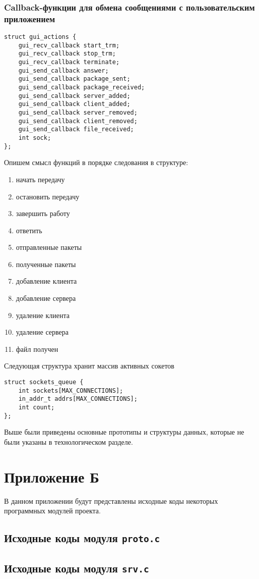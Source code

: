 \begin{appendix}
\subsubsection*{Callback-функции для обмена сообщениями с пользовательским приложением}
\begin{lstlisting}
struct gui_actions {
    gui_recv_callback start_trm;
    gui_recv_callback stop_trm;
    gui_recv_callback terminate;
    gui_send_callback answer;
    gui_send_callback package_sent;
    gui_send_callback package_received;
    gui_send_callback server_added;
    gui_send_callback client_added;
    gui_send_callback server_removed;
    gui_send_callback client_removed;
    gui_send_callback file_received;
    int sock;
};
\end{lstlisting}

Опишем смысл функций в порядке следования в структуре:

\begin{enumerate}
    \item начать передачу
    \item остановить передачу
    \item завершить работу
    \item ответить
    \item отправленные пакеты
    \item полученные пакеты
    \item добавление клиента
    \item добавление сервера
    \item удаление клиента
    \item удаление сервера
    \item файл получен
\end{enumerate}

Следующая структура хранит массив активных сокетов
\begin{lstlisting}
struct sockets_queue {
    int sockets[MAX_CONNECTIONS];
    in_addr_t addrs[MAX_CONNECTIONS];
    int count;
};
\end{lstlisting}

Выше были приведены основные прототипы и структуры данных, которые не
были указаны в технологическом разделе.

\section*{Приложение Б}
В данном приложении будут представлены исходные коды некоторых программных модулей проекта.
\subsection*{Исходные коды модуля \texttt{proto.c}}

\subsection*{Исходные коды модуля \texttt{srv.c}}

\end{appendix}
